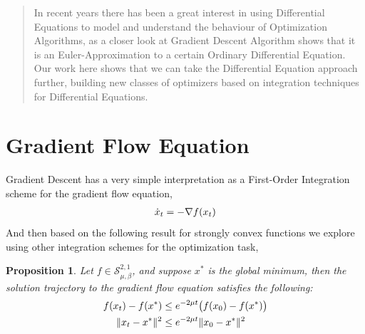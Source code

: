 \documentclass[a0,portrait]{a0poster}
\newtheorem{prop}{Proposition}
\begin{document}
\vspace{1cm} %
\begin{multicols}{3} %

\color{Navy} %
\begin{abstract}
In recent years there has been a great interest in using Differential Equations to model and understand the behaviour of Optimization Algorithms, as a closer look at Gradient Descent Algorithm shows that it is an Euler-Approximation to a certain Ordinary Differential Equation. Our work here shows that we can take the Differential Equation approach further, building new classes of optimizers based on integration techniques for Differential Equations.
\end{abstract}

\color{Black} %
\section*{Gradient Flow Equation}
Gradient Descent has a very simple interpretation as a First-Order Integration scheme for the gradient flow equation,
\begin{align*}\vspace{1cm}
\dot{x}_t = -\nabla f(x_t)
\end{align*}
\color{Black} %
And then based on the following result for strongly convex functions we explore using other integration schemes for the optimization task,

\begin{prop}
Let $f \in \mathcal{S}_{\mu, \beta}^{2,1}$, and suppose $x^*$ is the global minimum, then the solution trajectory to the gradient flow equation satisfies the following:
\begin{align*}\vspace{1cm}
f(x_t) - f(x^*) &\leq e^{-2 \mu t} \big( f(x_0) - f(x^*) \big) \\
\| x_t - x^* \|^2 &\leq e^{-2 \mu t} \| x_0 - x^* \|^2
\end{align*}
\end{prop}


\end{multicols}
\end{document}
